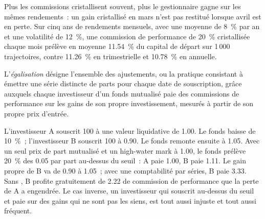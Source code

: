 Plus les commissions cristallisent souvent, plus le gestionnaire gagne sur les mêmes rendements~: un gain cristallisé en mars n'est pas restitué lorsque avril est en perte.
Sur cinq ans de rendements mensuels, avec une moyenne de 8~\% par an et une volatilité de 12~\%, une commission de performance de 20~\% cristallisée chaque mois prélève en moyenne 11.54~\%
du capital de départ sur 1\,000 trajectoires, contre 11.26~\% en  trimestrielle et 10.78~\% en  annuelle.

\begin{definition}[Égalisation]\label{def:fm:the-asset-manager-and-the-fund:eq}
L'\emph{égalisation} désigne l'ensemble des ajustements, ou la pratique consistant à émettre une série distincte de parts pour chaque date de souscription,
grâce auxquels chaque investisseur d'un fonds mutualisé paie des commissions de performance sur les gains de son propre investissement, mesurés à partir de son propre prix d'entrée.
\end{definition}

\begin{example}\label{ex:fm:the-asset-manager-and-the-fund:free}
L'investisseur A souscrit 100 à une valeur liquidative de 1.00. Le fonds baisse de 10~\%~; l'investisseur B souscrit 100 à 0.90. Le fonds remonte ensuite à 1.05. Avec
un seul prix de part mutualisé et un high-water mark à 1.00, le fonds prélève 20~\% des 0.05 par part au-dessus du seuil~: A paie 1.00, B paie 1.11. Le
gain propre de B va de 0.90 à 1.05~; avec une comptabilité par séries, B paie 3.33. Sans , B profite gratuitement de 2.22 de commission de performance que la perte de A
a engendrée. Le cas inverse, un investisseur qui souscrit au-dessus du seuil et paie sur des gains qui ne sont pas les siens, est tout aussi injuste et tout aussi fréquent.
\end{example}

